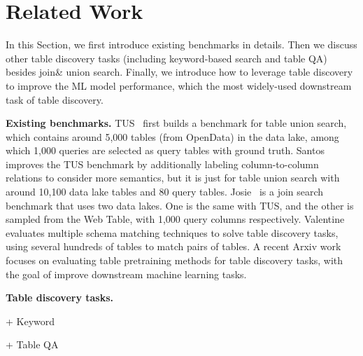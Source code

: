 \section{Related Work}
In this Section, we first introduce existing  benchmarks in details. Then we discuss other table discovery tasks  (including keyword-based search and table QA) besides join\& union search. Finally, we introduce how to leverage table discovery to improve the ML model performance, which the most widely-used downstream task of table discovery. 

\noindent \textbf{Existing benchmarks.} 
TUS~\cite{TUS} first builds a benchmark for table union search, which contains around 5,000 tables (from OpenData) in the data lake, among which 1,000 queries are selected as query tables with ground truth. 
%
Santos~\cite{Santos} improves the TUS benchmark by additionally labeling column-to-column relations to consider more semantics, but it is just for table union search with around 10,100 data lake tables and 80 query tables.
%
Josie~\cite{Josie} is a join search benchmark that uses two data lakes. One is the same with TUS, and the other is sampled from the Web Table, with 1,000 query columns respectively. 
%
Valentine~\cite{valentine} evaluates multiple schema matching techniques to solve table discovery tasks, using several hundreds of tables to match pairs of tables. 
%
A recent Arxiv work~\cite{arxiv} focuses on evaluating table pretraining methods for table
 discovery tasks, with the goal of improve downstream machine learning tasks. 
%

\noindent \textbf{Table discovery tasks.}

+ Keyword

+ Table QA


